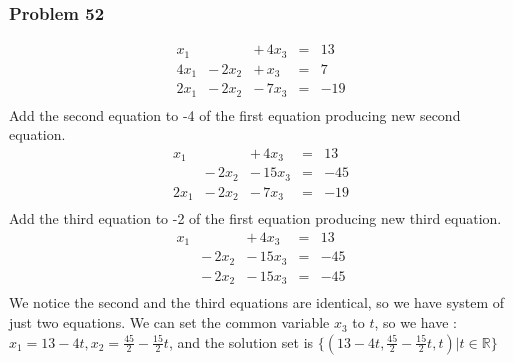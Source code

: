 \documentclass[a4paper,12pt]{article}
\begin{document}
\subsubsection*{Problem 52}
\[
\begin{array}{rrrrrrr}
x_1 &      & +\,4x_3 & = & 13 \\
4x_1 & -\,2x_2 & +\,x_3 & = & 7 \\
2x_1 & -\,2x_2 & -\,7x_3 & = & -19\\
\end{array}\] {Add the second equation to -4 of the first equation producing new second equation.}
\[
\begin{array}{rrrrrrr}
x_1 &      & +\,4x_3 & = & 13 \\
 & -\,2x_2 & -\,15x_3 & = & -45 \\
2x_1 & -\,2x_2 & -\,7x_3 & = & -19\\
\end{array}\]{Add the third equation to -2 of the first equation producing new third equation.}
\[\begin{array}{rrrrrrr}
x_1 &      & +\,4x_3 & = & 13 \\
 & -\,2x_2 & -\,15x_3 & = & -45 \\
& -\,2x_2 & -\,15x_3 & = & -45\\
\end{array}\]
We notice the second and the third equations are identical, so we have system of just two equations. We can set the common variable $x_3$ to $t$, so we have : \\ $x_1=13-4t, x_2=\frac{45}{2}-\frac{15}{2}t$, and the solution set is $\{(13-4t,\frac{45}{2}-\frac{15}{2}t,t)| t \in \mathbb{R}\}$
\end{document}
